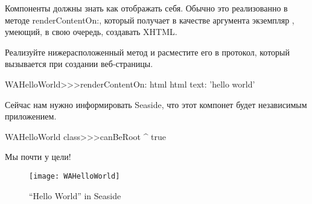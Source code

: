 \documentclass[a4paper,10pt,twoside]{book}
\begin{document}
Компоненты должны знать как отображать себя.
Обычно это реализованно в методе 
{renderContentOn:},
который получает в качестве аргумента экземпляр ,
умеющий, в свою очередь, создавать XHTML.



Реализуйте нижерасположенный метод и расместите его в протокол, который вызывается при создании веб-страницы.

\begin{code}{}
WAHelloWorld>>>renderContentOn: html
	html text: 'hello world'
\end{code}


\noindent
Сейчас нам нужно информировать Seaside,
что этот компонет будет независимым приложением.


\begin{code}{}
WAHelloWorld class>>>canBeRoot
	^ true
\end{code}


\noindent
Мы почти у цели!



\begin{figure}[htb]
\begin{center}
\texttt{[image: WAHelloWorld]}
\caption{``Hello World'' in Seaside}
\end{center}
\end{figure}
\end{document}
